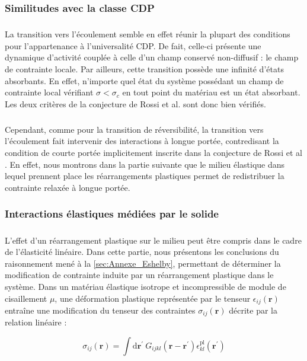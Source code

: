 \subsubsection{Similitudes avec la classe CDP}

\subparagraph{}La transition vers l'écoulement semble en effet réunir la plupart des conditions pour l'appartenance à l'universalité CDP. De fait, celle-ci présente une dynamique d'activité couplée à celle d'un champ conservé non-diffusif : le champ de contrainte locale. Par ailleurs, cette transition possède une infinité d'états absorbants. En effet, n'importe quel état du système possédant un champ de contrainte local vérifiant $\sigma < \sigma_c$ en tout point du matériau est un état absorbant. Les deux critères de la conjecture de Rossi et al. \cite{rossi_universality_2000} sont donc bien vérifiés.

\subparagraph{}Cependant, comme pour la transition de réversibilité, la transition vers l'écoulement fait intervenir des interactions à longue portée, contredisant la condition de courte portée implicitement inscrite dans la conjecture de Rossi et al \cite{rossi_universality_2000}. En effet, nous montrons dans la partie suivante que le milieu élastique dans lequel prennent place les réarrangements plastiques permet de redistribuer la contrainte relaxée à longue portée.

\subsubsection{Interactions élastiques médiées par le solide}

\label{sec:ref_interac_elast}

\subparagraph{}L'effet d'un réarrangement plastique sur le milieu peut être compris dans le cadre de l'élasticité linéaire. Dans cette partie, nous présentons les conclusions du raisonnement mené à la \autoref{sec:Annexe_Eshelby}, permettant de déterminer la modification de contrainte induite par un réarrangement plastique dans le système. Dans un matériau élastique isotrope et incompressible de module de cisaillement $\mu$, une déformation plastique représentée par le tenseur $\epsilon_{ij}(\mathbf{r})$ entraîne une modification du tenseur des contraintes $\sigma_{ij}(\mathbf{r})$ décrite par la relation linéaire :

\begin{equation}
	\sigma_{ij}(\mathbf{r}) = \int\mathrm{d}\mathbf{r}^\prime~ G_{ijkl}(\mathbf{r}-\mathbf{r}^\prime)\epsilon^\text{pl}_{kl}(\mathbf{r}^\prime)
\end{equation}

